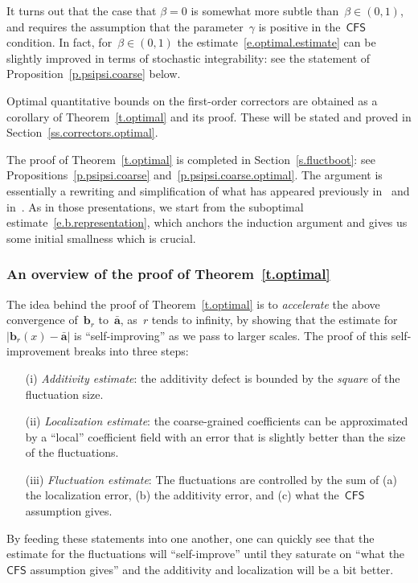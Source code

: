\documentclass[11pt]{article} %
\numberwithin{equation}{section}
\theoremstyle{definition}
\renewcommand{\b}{\ensuremath{\mathbf{b}}}
\renewcommand{\a}{\mathbf{a}}
\newcommand{\ahom}{\bar{\a}}
\newcommand{\CFS}{\mathsf{CFS}}
\begin{document}
\smallskip

It turns out that the case that $\beta = 0$ is somewhat more subtle than~$\beta\in (0,1)$, and requires the assumption that the parameter~$\gamma$ is positive in the~$\CFS$ condition. In fact, for~$\beta\in (0,1)$ the estimate~\eqref{e.optimal.estimate} can be slightly improved in terms of stochastic integrability: see the statement of Proposition~\ref{p.psipsi.coarse} below. 

\smallskip


Optimal quantitative bounds on the first-order correctors are obtained as a corollary of Theorem~\ref{t.optimal} and its proof.  
These will be stated and proved in Section~\ref{ss.correctors.optimal}.

\smallskip

The proof of Theorem~\ref{t.optimal} is completed in Section~\ref{s.fluctboot}: see Propositions~\ref{p.psipsi.coarse} and~\ref{p.psipsi.coarse.optimal}. 
The argument is essentially a rewriting and simplification of what has appeared previously in~\cite{AKM} and in~\cite[Chapter 4]{AKMBook}. As in those presentations,
we start from the suboptimal estimate~\eqref{e.b.representation}, which anchors the induction argument and gives us some initial smallness which is crucial. 

\subsubsection{An overview of the proof of Theorem~\ref{t.optimal}}

The idea behind the proof of Theorem~\ref{t.optimal} is to \emph{accelerate} the above convergence of~$\b_r$ to~$\ahom$, as~$r$ tends to infinity, by showing that the estimate for $\big| \b_r(x) - \ahom \big|$ is ``self-improving'' as we pass to larger scales. The proof of this self-improvement breaks into three steps: 

\begin{enumerate}
\item[(i)] \emph{Additivity estimate}: the additivity defect is bounded by the \emph{square} of the fluctuation size. 

\item[(ii)] \emph{Localization estimate}: the coarse-grained coefficients can be approximated by a ``local'' coefficient field with an error that is slightly better than the size of the fluctuations. 

\item[(iii)] \emph{Fluctuation estimate}: The fluctuations are controlled by the sum of (a) the localization error, (b) the additivity error, and (c) what the~$\CFS$ assumption gives.
 
\end{enumerate}
By feeding these statements into one another, one can quickly see that the estimate for the fluctuations will ``self-improve'' until they saturate on ``what the~$\CFS$ assumption gives'' and the additivity and localization will be a bit better. 
\end{document}
